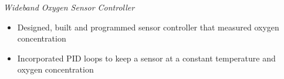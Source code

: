 \documentclass[line,mmmargin]{res}
\begin{document}
\begin{resume}
	{\sl Wideband Oxygen Sensor Controller}
		\begin{itemize} \itemsep -2pt
			\item Designed, built and programmed sensor controller that measured oxygen concentration
			\item Incorporated PID loops to keep a sensor at a constant temperature and oxygen concentration
		\end{itemize}


\end{resume}
\end{document}
